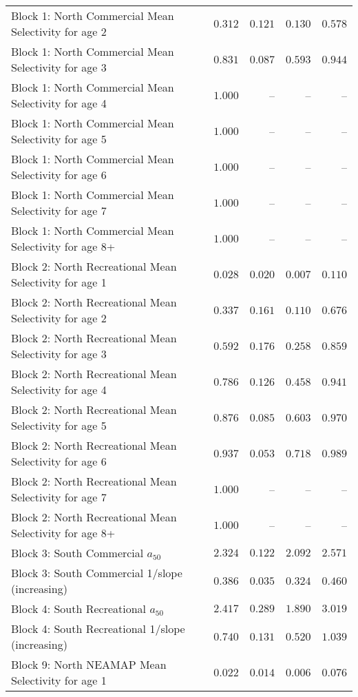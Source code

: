 \documentclass[
]{article}
\begin{document}
\begin{landscape}
\begin{longtable}[t]{lrrrr}
Block 1: North Commercial Mean Selectivity for age 2 & $0.312$ & $0.121$ & $0.130$ & $0.578$\\
Block 1: North Commercial Mean Selectivity for age 3 & $0.831$ & $0.087$ & $0.593$ & $0.944$\\
Block 1: North Commercial Mean Selectivity for age 4 & $1.000$ & -- & -- & --\\
Block 1: North Commercial Mean Selectivity for age 5 & $1.000$ & -- & -- & --\\
\addlinespace
Block 1: North Commercial Mean Selectivity for age 6 & $1.000$ & -- & -- & --\\
Block 1: North Commercial Mean Selectivity for age 7 & $1.000$ & -- & -- & --\\
Block 1: North Commercial Mean Selectivity for age 8+ & $1.000$ & -- & -- & --\\
Block 2: North Recreational Mean Selectivity for age 1 & $0.028$ & $0.020$ & $0.007$ & $0.110$\\
Block 2: North Recreational Mean Selectivity for age 2 & $0.337$ & $0.161$ & $0.110$ & $0.676$\\
\addlinespace
Block 2: North Recreational Mean Selectivity for age 3 & $0.592$ & $0.176$ & $0.258$ & $0.859$\\
Block 2: North Recreational Mean Selectivity for age 4 & $0.786$ & $0.126$ & $0.458$ & $0.941$\\
Block 2: North Recreational Mean Selectivity for age 5 & $0.876$ & $0.085$ & $0.603$ & $0.970$\\
Block 2: North Recreational Mean Selectivity for age 6 & $0.937$ & $0.053$ & $0.718$ & $0.989$\\
Block 2: North Recreational Mean Selectivity for age 7 & $1.000$ & -- & -- & --\\
\addlinespace
Block 2: North Recreational Mean Selectivity for age 8+ & $1.000$ & -- & -- & --\\
Block 3: South Commercial $a_{50}$ & $2.324$ & $0.122$ & $2.092$ & $2.571$\\
Block 3: South Commercial 1/slope (increasing) & $0.386$ & $0.035$ & $0.324$ & $0.460$\\
Block 4: South Recreational $a_{50}$ & $2.417$ & $0.289$ & $1.890$ & $3.019$\\
Block 4: South Recreational 1/slope (increasing) & $0.740$ & $0.131$ & $0.520$ & $1.039$\\
\addlinespace
Block 9: North NEAMAP Mean Selectivity for age 1 & $0.022$ & $0.014$ & $0.006$ & $0.076$\\

\end{longtable}
\end{landscape}
\end{document}
